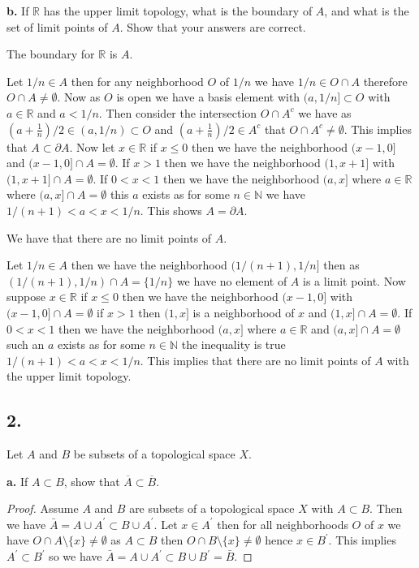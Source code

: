 \documentclass{amsart}
\theoremstyle{plain}
\theoremstyle{definition}
\theoremstyle{remark}
\begin{document}
\vspace{.1in}
{\bfseries b.} If $\mathbb R$ has the upper limit topology, what is the boundary of $A$, and what is the set of limit points of $A$. Show that your answers are correct. 

The boundary for $\mathbb R$ is $A$.


Let $1/n\in A$ then for any neighborhood $O$ of $1/n$ we have $1/n\in O \cap A$ therefore $O\cap A\not = \emptyset$. Now as $O$ is open we have a basis element with $(a,1/n]\subset O$ with $a\in \mathbb{R}$ and $a<1/n$. Then consider the intersection $O \cap A^c$ we have as $(a+\frac{1}{n})/2 \in (a,1/n)\subset O$ and $(a+\frac{1}{n})/2\in A^c$ that $O\cap A^c \not = \emptyset$. This implies that $A\subset \partial A$. Now let $x\in \mathbb{R}$ if $x\leq 0$ then we have the neighborhood $(x-1,0]$ and $(x-1,0]\cap A=\emptyset$. If $x>1$ then we have the neighborhood $(1,x+1]$ with $(1,x+1]\cap A=\emptyset$. If $0<x<1$ then we have the neighborhood $(a,x]$ where $a\in \mathbb R$ where $(a,x]\cap A=\emptyset$ this $a$ exists as for some $n\in \mathbb{N}$ we have $1/(n+1)<a<x<1/n$. 
This shows $A=\partial A$. 

We have that there are no limit points of $A$. 

Let $1/n\in A$ then we have the neighborhood $(1/(n+1),1/n]$ then as $(1/(n+1),1/n)\cap A=\{1/n\}$ we have no element of $A$ is a limit point. Now suppose $x\in \mathbb{R}$ if $x\leq 0$ then we have the neighborhood $(x-1,0]$ with $(x-1,0]\cap A=\emptyset$ if $x>1$ then $(1,x]$ is a neighborhood of $x$ and $(1,x]\cap A=\emptyset$. If $0<x<1$ then we have the neighborhood $(a,x]$ where $a\in \mathbb{R}$ and $(a,x]\cap A=\emptyset$ such an $a$ exists as for some $n\in \mathbb{N}$ the inequality is true $1/(n+1)<a<x<1/n$. This implies that there are no limit points of $A$ with the upper limit topology.


\vspace{.15in}

\noindent
\subsection*{2.} Let $A$ and $B$ be subsets of a topological space $X$. 

\vspace{.1in}
{\bfseries a.} If $A\subset B$, show that $\overline{A} \subset \overline{B}$. 

\begin{proof}
    Assume $A$ and $B$ are subsets of a topological space $X$ with $A\subset B$. Then we have $\bar A=A\cup A^\prime\subset B\cup A^\prime$. Let $x\in A^\prime$ then for all neighborhoods $O$ of $x$ we have $O\cap A\setminus 
    \{x\}\not = \emptyset$ as $A\subset B$ then $O\cap B\setminus \{x\}\not = \emptyset$ hence $x\in B^\prime$. This implies $A^\prime\subset B^\prime$ so we have $\bar A=A\cup A^\prime \subset B\cup B^\prime = \bar B$.
\end{proof}
\end{document}

